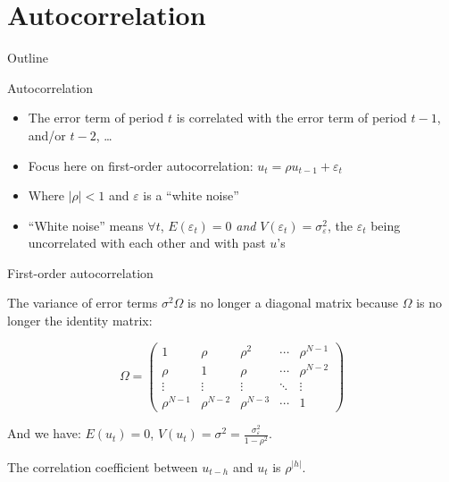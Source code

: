 \documentclass[aspectratio=169]{beamer}
\begin{document}
\section{Autocorrelation}

\begin{frame}{Outline}
\tableofcontents[currentsection]
\end{frame}

\begin{frame}{Autocorrelation}

\begin{itemize}
    \item The error term of period $t$ is correlated with the error term of period $t-1$, and/or $t-2$, \dots
    \item Focus here on first-order autocorrelation: $u_t = \rho u_{t-1} + \varepsilon_t$
    \item Where $|\rho| < 1$ and $\varepsilon$ is a ``white noise''
    \item ``White noise'' means $\forall t$, $E(\varepsilon_t) = 0$ \textit{and} $V(\varepsilon_t) = \sigma_\varepsilon^2$, the $\varepsilon_t$ being uncorrelated with each other and with past $u$'s
\end{itemize}

\end{frame}

\begin{frame}{First-order autocorrelation}

The variance of error terms $\sigma^2\Omega$ is no longer a diagonal matrix because $\Omega$ is no longer the identity matrix:

\[
\Omega = \begin{pmatrix}
1 & \rho & \rho^2 & \cdots & \rho^{N-1}\\
\rho & 1 & \rho & \cdots & \rho^{N-2}\\
\vdots & \vdots & \vdots & \ddots & \vdots\\
\rho^{N-1} & \rho^{N-2} & \rho^{N-3} & \cdots & 1
\end{pmatrix}
\]

And we have: $E(u_t) = 0$, $V(u_t) = \sigma^2 = \frac{\sigma_\varepsilon^2}{1-\rho^2}$.

The correlation coefficient between $u_{t-h}$ and $u_t$ is $\rho^{|h|}$.

\end{frame}
\end{document}
